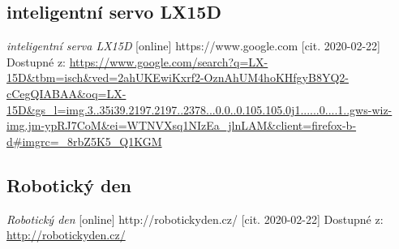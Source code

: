 \documentclass{template/socthesis}
\begin{document}
\begin{thebibliography}{12}
			\subsection*{inteligentní servo LX15D}
			
			\textit{inteligentní serva LX15D} [online] https://www.google.com [cit. 2020-02-22] Dostupné z:
			\url{https://www.google.com/search?q=LX-15D&tbm=isch&ved=2ahUKEwiKxrf2-OznAhUM4hoKHfgyB8YQ2-cCegQIABAA&oq=LX-15D&gs_l=img.3..35i39.2197.2197..2378...0.0..0.105.105.0j1......0....1..gws-wiz-img.jm-ypRJ7CoM&ei=WTNVXsq1NIzEa_jlnLAM&client=firefox-b-d#imgrc=_8rbZ5K5_Q1KGM}
			
			\subsection*{Robotický den}
			
			\textit{Robotický den} [online] http://robotickyden.cz/ [cit. 2020-02-22] Dostupné z:
			\url{http://robotickyden.cz/}
			
		\end{thebibliography}
\end{document}
